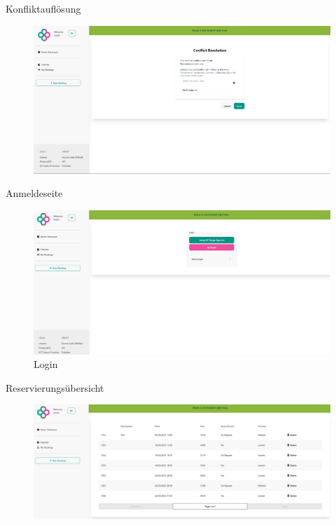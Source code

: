 \begin{frame}{Konfliktauflösung}
    \thispagestyle{plain}
    \begin{figure}
        \centering
        \includegraphics[width=1\linewidth]{pictures/conflict_resolution.png}
        
        \label{fig:enter-label}
    \end{figure}
\end{frame}

\begin{frame}{Anmeldeseite}
    \thispagestyle{plain}
    \begin{figure}
        \centering
        \includegraphics[width=1\linewidth]{pictures/auth_login.png}
        \caption{Login}
        \label{fig:enter-label}
    \end{figure}
\end{frame}

\begin{frame}{Reservierungsübersicht}
    \thispagestyle{plain}
    \begin{figure}
        \centering
        \includegraphics[width=1\linewidth]{pictures/bookings_list.png}
        \label{fig:enter-label}
    \end{figure}
\end{frame}

